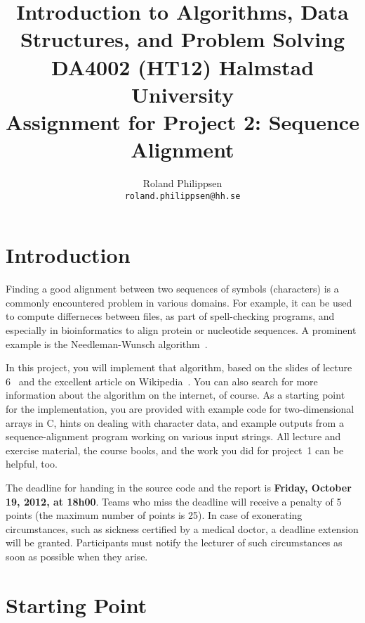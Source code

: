 \documentclass[a4paper,10pt]{article}
\begin{document}
\title{
  {\normalsize
    Introduction to Algorithms, Data Structures, and Problem Solving\\
    DA4002 (HT12) Halmstad University}\\
  Assignment for Project 2: Sequence Alignment\\
}
\author{
  Roland Philippsen\\
  \texttt{roland.philippsen@hh.se}
}
\maketitle



\section{Introduction}

Finding a good alignment between two sequences of symbols (characters) is a commonly encountered problem in various domains.
For example, it can be used to compute differneces between files, as part of spell-checking programs, and especially in bioinformatics to align protein or nucleotide sequences.
A prominent example is the Needleman-Wunsch algorithm~\cite{needleman-wunsch:1970}.

In this project, you will implement that algorithm, based on the slides of lecture 6~\cite{lecture6} and the excellent article on Wikipedia~\cite{wikipedia:needleman-wunsch}.
You can also search for more information about the algorithm on the internet, of course.
As a starting point for the implementation, you are provided with example code for two-dimensional arrays in C, hints on dealing with character data, and example outputs from a sequence-alignment program working on various input strings.
All lecture and exercise material, the course books, and the work you did for project~1 can be helpful, too.

The deadline for handing in the source code and the report is \textbf{Friday, October 19, 2012, at 18h00}.
Teams who miss the deadline will receive a penalty of 5 points (the maximum number of points is 25).
In case of exonerating circumstances, such as sickness certified by a medical doctor, a deadline extension will be granted.
Participants must notify the lecturer of such circumstances as soon as possible when they arise.



\section{Starting Point}
\end{document}
